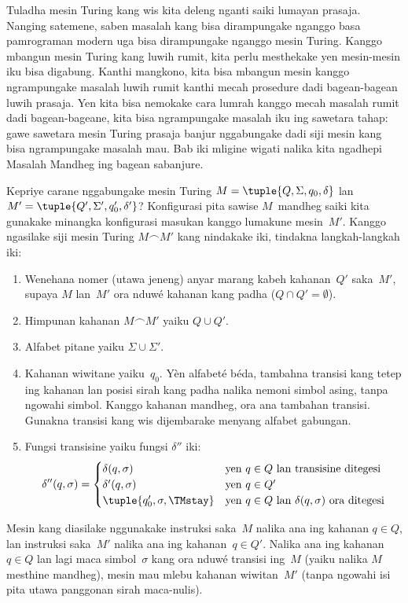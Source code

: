 \documentclass[../../../include/open-logic-section]{subfiles}
\begin{document}

\begin{explain}
Tuladha mesin Turing kang wis kita deleng nganti saiki
lumayan prasaja. Nanging satemene, saben masalah kang
bisa dirampungake nganggo basa pamrograman modern uga
bisa dirampungake nganggo mesin Turing. Kanggo mbangun
mesin Turing kang luwih rumit, kita perlu mesthekake
yen mesin-mesin iku bisa digabung. Kanthi mangkono,
kita bisa mbangun mesin kanggo ngrampungake masalah
luwih rumit kanthi mecah prosedure dadi bagean-bagean
luwih prasaja. Yen kita bisa nemokake cara lumrah
kanggo mecah masalah rumit dadi bagean-bageane,
kita bisa ngrampungake masalah iku ing sawetara
tahap: gawe sawetara mesin Turing prasaja banjur
nggabungake dadi siji mesin kang bisa ngrampungake
masalah mau. Bab iki mligine wigati nalika kita
ngadhepi Masalah Mandheg ing bagean sabanjure.

Kepriye carane nggabungake mesin Turing
$M = \tuple{Q, \Sigma, q_0, \delta}$ lan~$M' =
\tuple{Q', \Sigma', q_0', \delta'}$? Konfigurasi pita
sawise $M$~mandheg saiki kita gunakake minangka
konfigurasi masukan kanggo lumakune mesin~$M'$.
Kanggo ngasilake siji mesin Turing $M \frown M'$
kang nindakake iki, tindakna langkah-langkah iki:
\begin{enumerate}
    \item Wenehana nomer (utawa jeneng) anyar marang kabeh
    kahanan~$Q'$ saka~$M'$, supaya $M$ lan~$M'$
    ora nduwé kahanan kang padha ($Q \cap Q' = \emptyset$).
    \item Himpunan kahanan $M \frown M'$ yaiku $Q \cup Q'$.
    \item Alfabet pitane yaiku $\Sigma \cup \Sigma'$.
    \item Kahanan wiwitane yaiku~$q_0$.
 Yèn alfabeté béda, tambahna transisi kang tetep ing kahanan lan posisi sirah kang padha nalika nemoni simbol asing, tanpa ngowahi simbol. Kanggo kahanan mandheg, ora ana tambahan transisi. Gunakna transisi kang wis dijembarake menyang alfabet gabungan.
    \item Fungsi transisine yaiku fungsi $\delta''$ iki:
    \[\delta''(q,\sigma) =
    \begin{cases}
      \delta(q,\sigma) & \text{yen $q \in Q$ lan transisine ditegesi}\\
      \delta'(q,\sigma) & \text{yen $q \in Q'$}\\
      \tuple{q_0', \sigma, \TMstay} & \text{yen $q \in Q$ lan
      $\delta(q,\sigma)$ ora ditegesi}
    \end{cases}\]
\end{enumerate}
Mesin kang diasilake nggunakake instruksi saka~$M$
nalika ana ing kahanan $q \in Q$, lan instruksi
saka~$M'$ nalika ana ing kahanan~$q \in Q'$.
Nalika ana ing kahanan $q \in Q$ lan lagi maca
simbol~$\sigma$ kang ora nduwé transisi ing~$M$
(yaiku nalika $M$ mesthine mandheg), mesin mau
mlebu kahanan wiwitan~$M'$ (tanpa ngowahi isi
pita utawa panggonan sirah maca-nulis).


\end{explain}
\end{document}
